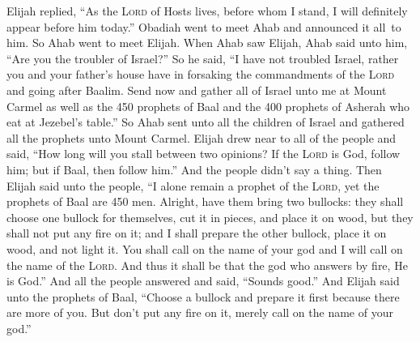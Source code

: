 \begin{inparaenum}
     Elijah replied, ``As the \textsc{Lord} of Hosts lives, before whom I stand, I will definitely appear before him today.''%
     Obadiah went to meet Ahab and announced it all\understood\ to him. So Ahab went to meet Elijah.%
     When Ahab saw Elijah, Ahab said unto him, ``Are you the troubler of Israel?''%
     So he said, ``I have not troubled Israel, rather you and your father's house have in forsaking the commandments of the \textsc{Lord} and going after Baalim.%
     Send now and gather all of Israel unto me at Mount Carmel as well as the 450 prophets of Baal and the 400 prophets of Asherah who eat at Jezebel's table.''%
     So Ahab sent unto all the children of Israel and gathered all the prophets unto Mount Carmel.%
     Elijah drew near to all of the people and said, ``How long will you stall between two opinions? If the \textsc{Lord} is God, follow him; but if Baal, then follow him.'' And the people didn't say a thing.%
     Then Elijah said unto the people, ``I alone remain a prophet of the \textsc{Lord}, yet the prophets of Baal are 450 men.%
     Alright, have them bring two bullocks: they shall choose one bullock for themselves, cut it in pieces, and place it on wood, but they shall not put any fire on it; and I shall prepare the other bullock, place it on wood, and not light it.%
     You shall call on the name of your god and I will call on the name of the \textsc{Lord}. And thus it shall be that the god who answers by fire, He is God.'' And all the people answered and said, ``Sounds good.''%
     And Elijah said unto the prophets of Baal, ``Choose a bullock and prepare it first because there are more of you. But don't put any fire on it, merely call on the name of your god.''%

\end{inparaenum}
